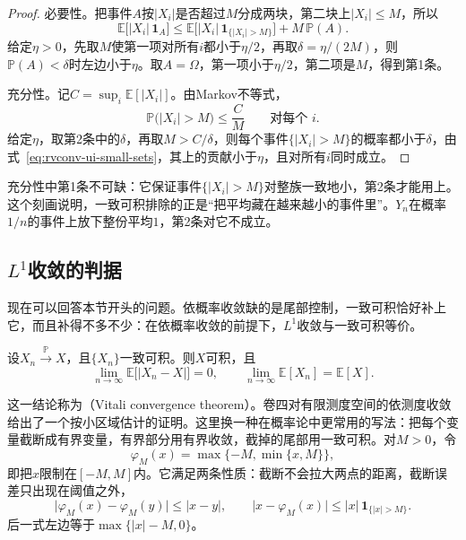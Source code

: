 \begin{proof}
必要性。把事件$A$按$\lvert X_i\rvert$是否超过$M$分成两块，第二块上$\lvert X_i\rvert\leq M$，所以
\[
 \mathbb{E}\bigl[\lvert X_i\rvert\,\mathbf{1}_{A}\bigr]\leq\mathbb{E}\bigl[\lvert X_i\rvert\,\mathbf{1}_{\{\lvert X_i\rvert>M\}}\bigr]+M\,\mathbb{P}(A) .
\]
给定$\eta>0$，先取$M$使第一项对所有$i$都小于$\eta/2$，再取$\delta=\eta/(2M)$，则$\mathbb{P}(A)<\delta$时左边小于$\eta$。取$A=\Omega$，第一项小于$\eta/2$，第二项是$M$，得到第1条。

充分性。记$C=\sup_i\mathbb{E}[\lvert X_i\rvert]$。由Markov不等式，
\[
 \mathbb{P}\bigl(\lvert X_i\rvert>M\bigr)\leq\frac{C}{M}\qquad\text{对每个 }i .
\]
给定$\eta$，取第2条中的$\delta$，再取$M>C/\delta$，则每个事件$\{\lvert X_i\rvert>M\}$的概率都小于$\delta$，由式~\eqref{eq:rvconv-ui-small-sets}，其上的贡献小于$\eta$，且对所有$i$同时成立。
\end{proof}

充分性中第1条不可缺：它保证事件$\{\lvert X_i\rvert>M\}$对整族一致地小，第2条才能用上。这个刻画说明，一致可积排除的正是“把平均藏在越来越小的事件里”。$Y_n$在概率$1/n$的事件上放下整份平均$1$，第2条对它不成立。

\subsection{\texorpdfstring{$L^{1}$}{L1}收敛的判据}
\label{sec:rvconv-l1-criterion}

现在可以回答本节开头的问题。依概率收敛缺的是尾部控制，一致可积恰好补上它，而且补得不多不少：在依概率收敛的前提下，$L^{1}$收敛与一致可积等价。

\begin{theorem}[Vitali收敛定理]
\label{thm:rvconv-vitali}
设$X_n\xrightarrow{\mathbb{P}}X$，且$\{X_n\}$一致可积。则$X$可积，且
\begin{equation}
 \lim_{n\to\infty}\mathbb{E}\bigl[\lvert X_n-X\rvert\bigr]=0,\qquad \lim_{n\to\infty}\mathbb{E}[X_n]=\mathbb{E}[X] .
 \label{eq:rvconv-vitali}
\end{equation}
\end{theorem}

这一结论称为（Vitali convergence theorem）。卷四对有限测度空间的依测度收敛给出了一个按小区域估计的证明。这里换一种在概率论中更常用的写法：把每个变量截断成有界变量，有界部分用有界收敛，截掉的尾部用一致可积。对$M>0$，令
\[
 \varphi_M(x)=\max\{-M,\min\{x,M\}\} ,
\]
即把$x$限制在$[-M,M]$内。它满足两条性质：截断不会拉大两点的距离，截断误差只出现在阈值之外，
\[
 \lvert\varphi_M(x)-\varphi_M(y)\rvert\leq\lvert x-y\rvert,\qquad
 \lvert x-\varphi_M(x)\rvert\leq\lvert x\rvert\,\mathbf{1}_{\{\lvert x\rvert>M\}} .
\]
后一式左边等于$\max\{\lvert x\rvert-M,0\}$。

